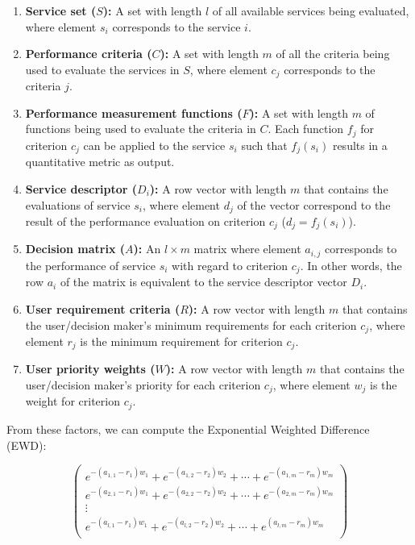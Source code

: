\begin{enumerate}
\def\labelenumi{\arabic{enumi}.}
\tightlist
\item
  \textbf{Service set (\(S\)):} A set with length \(l\) of all available
  services being evaluated, where element \(s_i\) corresponds to the
  service \(i\).
\item
  \textbf{Performance criteria (\(C\)):} A set with length \(m\) of all
  the criteria being used to evaluate the services in \(S\), where
  element \(c_j\) corresponds to the criteria \(j\).
\item
  \textbf{Performance measurement functions (\(F\)):} A set with length
  \(m\) of functions being used to evaluate the criteria in \(C\). Each
  function \(f_j\) for criterion \(c_j\) can be applied to the service
  \(s_i\) such that \(f_j(s_i)\) results in a quantitative metric as
  output.
\item
  \textbf{Service descriptor (\(D_i\)):} A row vector with length \(m\)
  that contains the evaluations of service \(s_i\), where element
  \(d_j\) of the vector correspond to the result of the performance
  evaluation on criterion \(c_j\) (\(d_j=f_j(s_i)\)).
\item
  \textbf{Decision matrix (\(A\)):} An \(l \times m\) matrix where
  element \(a_{i,j}\) corresponds to the performance of service \(s_i\)
  with regard to criterion \(c_j\). In other words, the row \(a_i\) of
  the matrix is equivalent to the service descriptor vector \(D_i\).
\item
  \textbf{User requirement criteria (\(R\)):} A row vector with length
  \(m\) that contains the user/decision maker's minimum requirements for
  each criterion \(c_j\), where element \(r_j\) is the minimum
  requirement for criterion \(c_j\).
\item
  \textbf{User priority weights (\(W\)):} A row vector with length \(m\)
  that contains the user/decision maker's priority for each criterion
  \(c_j\), where element \(w_j\) is the weight for criterion \(c_j\).
\end{enumerate}

From these factors, we can compute the Exponential Weighted Difference
(EWD):

\[
\begin{pmatrix}
e^{-(a_{1,1} - r_1)w_1} + e^{-(a_{1,2} - r_2)w_2} + \cdots + e^{-(a_{1,m} - r_m)w_m} \\
e^{-(a_{2,1} - r_1)w_1} + e^{-(a_{2,2} - r_2)w_2} + \cdots + e^{-(a_{2,m} - r_m)w_m} \\
\vdots \\
e^{-(a_{l,1} - r_1)w_1} + e^{-(a_{l,2} - r_2)w_2} + \cdots + e^{(a_{l,m} - r_m)w_m} \\
\end{pmatrix}
\]

